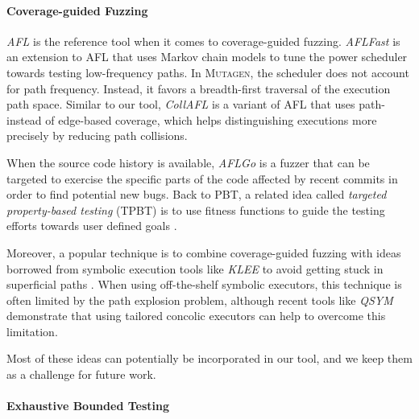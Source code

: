 \documentclass[sigconf, anonymous]{acmart}
\newcommand{\mutagen}{\textsc{Mutagen}\xspace}
\begin{document}
\paragraph{Coverage-guided Fuzzing}

\emph{AFL} \cite{afl} is the reference tool when it comes to coverage-guided
fuzzing.
%
\emph{AFLFast} \cite{bohme2017coverage} is an extension to AFL that uses Markov
chain models to tune the power scheduler towards testing low-frequency paths.
%
In \mutagen, the scheduler does not account for path frequency.
%
Instead, it favors a breadth-first traversal of the execution path space.
%
Similar to our tool, \emph{CollAFL} \cite{gan2018collafl} is a variant of AFL
that uses path- instead of edge-based coverage, which helps distinguishing
executions more precisely by reducing path collisions.

When the source code history is available, \emph{AFLGo} \cite{bohme2017directed}
is a fuzzer that can be targeted to exercise the specific parts of the code
affected by recent commits in order to find potential new bugs.
%
Back to PBT, a related idea called \emph{targeted property-based testing} (TPBT)
is to use fitness functions to guide the testing efforts towards user defined
goals \cite{loscher2017targeted, loscher2018automating}.


%
Moreover, a popular technique is to combine coverage-guided fuzzing with ideas
borrowed from symbolic execution tools like \emph{KLEE} \cite{cadar2008klee} to
avoid getting stuck in superficial paths \cite{stephens2016driller}.
%
When using off-the-shelf symbolic executors, this technique is often limited by
the path explosion problem, although recent tools like \emph{QSYM}
\cite{yun2018qsym} demonstrate that using tailored concolic executors can help
to overcome this limitation.


Most of these ideas can potentially be incorporated in our tool, and we keep
them as a challenge for future work.


\paragraph{Exhaustive Bounded Testing}
\end{document}
